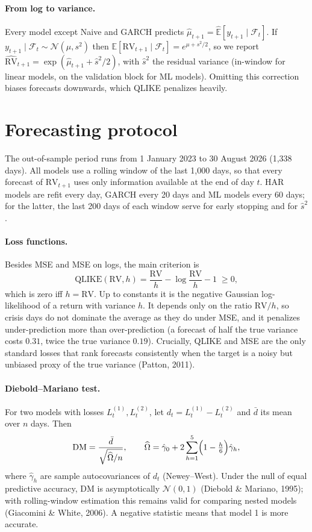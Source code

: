 \documentclass[11pt,a4paper]{article}
\newcommand{\RV}{\mathrm{RV}}
\newcommand{\E}{\mathbb{E}}
\begin{document}
\paragraph{From log to variance.} Every model except Naive and GARCH predicts $\hat\mu_{t+1}=\widehat{\E}[y_{t+1}\mid\mathcal F_t]$.
If $y_{t+1}\mid\mathcal F_t\sim\mathcal N(\mu,s^2)$ then $\E[\RV_{t+1}\mid\mathcal F_t]=e^{\mu+s^2/2}$, so we report
$\widehat{\RV}_{t+1}=\exp(\hat\mu_{t+1}+\hat s^2/2)$, with $\hat s^2$ the residual variance (in-window for linear models,
on the validation block for ML models). Omitting this correction biases forecasts downwards, which QLIKE penalizes heavily.

\section{Forecasting protocol}

The out-of-sample period runs from 1 January 2023 to 30 August 2026 (1{,}338 days). All models use a rolling window of the last 1{,}000
days, so that every forecast of $\RV_{t+1}$ uses only information available at the end of day $t$. HAR models are refit every day, GARCH every
20 days and ML models every 60 days; for the latter, the last 200 days of each window serve for early stopping and for $\hat s^2$.

\paragraph{Loss functions.} Besides MSE and MSE on logs, the main criterion is
\begin{equation}
\mathrm{QLIKE}(\RV,h)=\frac{\RV}{h}-\log\frac{\RV}{h}-1\;\ge 0,
\end{equation}
which is zero iff $h=\RV$. Up to constants it is the negative Gaussian log-likelihood of a return with variance $h$. It depends only on the
ratio $\RV/h$, so crisis days do not dominate the average as they do under MSE, and it penalizes under-prediction more than over-prediction
(a forecast of half the true variance costs $0.31$, twice the true variance $0.19$). Crucially, QLIKE and MSE are the only standard losses that
rank forecasts consistently when the target is a noisy but unbiased proxy of the true variance (Patton, 2011).

\paragraph{Diebold--Mariano test.} For two models with losses $L^{(1)}_t,L^{(2)}_t$, let $d_t=L^{(1)}_t-L^{(2)}_t$ and $\bar d$ its mean over $n$ days. Then
\begin{equation}
\mathrm{DM}=\frac{\bar d}{\sqrt{\widehat{\Omega}/n}},\qquad
\widehat{\Omega}=\hat\gamma_0+2\sum_{h=1}^{5}\Bigl(1-\tfrac{h}{6}\Bigr)\hat\gamma_h ,
\end{equation}
where $\hat\gamma_h$ are sample autocovariances of $d_t$ (Newey--West). Under the null of equal predictive accuracy, $\mathrm{DM}$ is asymptotically
$\mathcal N(0,1)$ (Diebold \& Mariano, 1995); with rolling-window estimation this remains valid for comparing nested models (Giacomini \& White, 2006).
A negative statistic means that model 1 is more accurate.
\end{document}
